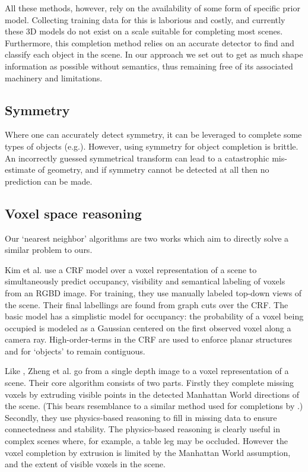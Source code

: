 \documentclass[10pt,twocolumn,letterpaper]{article}
\makeatletter
\renewcommand*{\eg}{e.g.\@\xspace}
\newcommand*{\ea}{et al.\@\xspace}
\makeatother
\begin{document}
All these methods, however, rely on the availability of some form of specific prior model.
Collecting training data for this is laborious and costly, and currently these 3D models do not exist on a scale suitable for completing most scenes.
Furthermore, this completion method relies on an accurate detector to find and classify each object in the scene.
In our approach we set out to get as much shape information as possible without semantics, thus remaining free of its associated machinery and limitations.



\subsection{Symmetry}
Where one can accurately detect symmetry, it can be leveraged to complete some types of objects (\eg \cite{law-cviu-2010, thrun-iccv-2005, kroemer-humanoids-2012}). 
However, using symmetry for object completion is brittle.
An incorrectly guessed symmetrical transform can lead to a catastrophic mis-estimate of geometry, and if symmetry cannot be detected at all then no prediction can be made.


\subsection{Voxel space reasoning}

Our `nearest neighbor' algorithms are two works which aim to directly solve a similar problem to ours.

Kim \ea \cite{kim-iccv-2013} use a CRF model over a voxel representation of a scene to simultaneously predict occupancy, visibility and semantical labeling of voxels from an RGBD image. 
For training, they use manually labeled top-down views of the scene.
Their final labellings are found from graph cuts over the CRF.
The basic model has a simplistic model for occupancy: the probability of a voxel being occupied is modeled as a Gaussian centered on the first observed voxel along a camera ray.
High-order-terms in the CRF are used to enforce planar structures and for `objects' to remain contiguous.

Like \cite{kim-iccv-2013},  Zheng \ea \cite{zheng-cvpr-2013} go from a single depth image to a voxel representation of a scene.
Their core algorithm consists of two parts.
Firstly they complete missing voxels by extruding visible points in the detected Manhattan World directions of the scene.
(This bears resemblance to a similar method used for completions by \cite{kroemer-humanoids-2012}.)
Secondly, they use physics-based reasoning to fill in missing data to ensure connectedness and stability.
The physics-based reasoning is clearly useful in complex scenes where, for example, a table leg may be occluded.
However the voxel completion by extrusion is limited by the Manhattan World assumption, and the extent of visible voxels in the scene.
\end{document}
